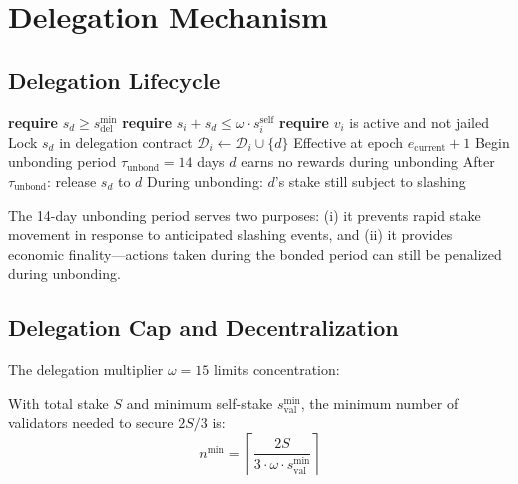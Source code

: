 \section{Delegation Mechanism}
\label{sec:delegation}

\subsection{Delegation Lifecycle}

\begin{algorithm}[H]
\caption{Delegation Protocol}
\label{alg:delegation}
\begin{algorithmic}[1]
    \State \textbf{require} $s_d \geq s^{\min}_{\text{del}}$
    \State \textbf{require} $s_i + s_d \leq \omega \cdot s_i^{\text{self}}$
    \State \textbf{require} $v_i$ is active and not jailed
    \State Lock $s_d$ in delegation contract
    \State $\mathcal{D}_i \gets \mathcal{D}_i \cup \{d\}$
    \State Effective at epoch $e_{\text{current}} + 1$
\EndProcedure
{}
    \State Begin unbonding period $\tau_{\text{unbond}} = 14$ days
    \State $d$ earns no rewards during unbonding
    \State After $\tau_{\text{unbond}}$: release $s_d$ to $d$
    \State During unbonding: $d$'s stake still subject to slashing
\EndProcedure
\end{algorithmic}
\end{algorithm}

The 14-day unbonding period serves two purposes: (i) it prevents rapid stake movement in response to anticipated slashing events, and (ii) it provides economic finality---actions taken during the bonded period can still be penalized during unbonding.

\subsection{Delegation Cap and Decentralization}

The delegation multiplier $\omega = 15$ limits concentration:

\begin{proposition}
With total stake $S$ and minimum self-stake $s^{\min}_{\text{val}}$, the minimum number of validators needed to secure $2S/3$ is:
\begin{equation}
    n^{\min} = \left\lceil \frac{2S}{3 \cdot \omega \cdot s^{\min}_{\text{val}}} \right\rceil
\end{equation}
\end{proposition}

